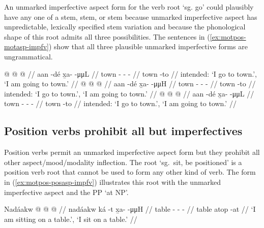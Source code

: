 \documentclass[12pt,letterpaper,oneside,article]{memoir}
\begin{document}
An unmarked imperfective aspect form for the verb root  ‘sg. go’ could plausibly have any one of a  stem,  stem, or  stem because unmarked imperfective aspect has unpredictable, lexically specified stem variation and because the phonological shape of this root admits all three possibilities.
The sentences in (\ref{ex:motpos-motasp-impfv}) show that all three plausible unmarked imperfective forms are ungrammatical.

\pex\label{ex:motpos-motasp-impfv}%
\a\label{ex:motpos-motasp-impfv-uH}%
\ljudge{*}%
%
\begingl
	\gla	{} @ {}  @ {} @ {} //
	\glb	aan -dé x̱a-  -μμL //
	\glc	town - -  - //
	\gld	town -to  {} {} //
	\glft	intended: ‘I go to town.’, ‘I am going to town.’
		//
\endgl
\a\label{ex:motpos-motasp-impfv-uuH}%
\ljudge{*}%
%
\begingl
	\gla	{} @ {}  @ {} @ {} //
	\glb	aan -dé x̱a-  -μμH //
	\glc	town - -  - //
	\gld	town -to  {} {} //
	\glft	intended: ‘I go to town.’, ‘I am going to town.’
		//
\endgl
\a\label{ex:motpos-motasp-impfv-uuL}%
\ljudge{*}%
%
\begingl
	\gla	{} @ {}  @ {} @ {} //
	\glb	aan -dé x̱a-  -μμL //
	\glc	town - -  - //
	\gld	town -to  {} {} //
	\glft	intended: ‘I go to town.’, ‘I am going to town.’
		//
\endgl
\xe

\subsection{Position verbs prohibit all but imperfectives}\label{sec:motpos-posasp}

Position verbs permit an unmarked imperfective aspect form but they prohibit all other aspect/mood/modality inflection.
The root  ‘sg.\ sit, be positioned’ is a position verb root that cannot be used to form any other kind of verb.
The form in (\ref{ex:motpos-posasp-impfv}) illustrates this root with the unmarked imperfective aspect and the PP  ‘at NP’.

\ex\label{ex:motpos-posasp-impfv}%
%
\begingl
	\gla	Nadáakw  @ {}  @ {} @ {} //
	\glb	nadáakw ká -t x̱a-  -μμH //
	\glc	table  - -  - //
	\gld	table atop -at  {} {} //
	\glft	‘I am sitting on a table.’, ‘I sit on a table.’
		//
\endgl
\xe
\end{document}
